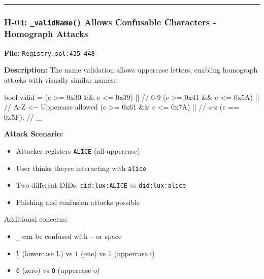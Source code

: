 \documentclass[
]{article}
\newenvironment{Shaded}{}{}
\newcommand{\NormalTok}[1]{#1}
\providecommand{\tightlist}{%
  \setlength{\itemsep}{0pt}\setlength{\parskip}{0pt}}
\begin{document}
\begin{center}\rule{0.5\linewidth}{0.5pt}\end{center}

\subsubsection{\texorpdfstring{H-04: \texttt{\_validName()} Allows
Confusable Characters - Homograph
Attacks}{H-04: \_validName() Allows Confusable Characters - Homograph Attacks}}\label{h-04-_validname-allows-confusable-characters---homograph-attacks}

\textbf{File:} \texttt{Registry.sol:435-448}

\textbf{Description:} The name validation allows uppercase letters,
enabling homograph attacks with visually similar names:

\begin{Shaded}
\begin{Highlighting}[]
\NormalTok{bool valid = (c \textgreater{}= 0x30 \&\& c \textless{}= 0x39) ||  // 0{-}9}
\NormalTok{            (c \textgreater{}= 0x41 \&\& c \textless{}= 0x5A) ||   // A{-}Z  \textless{}{-}{-} Uppercase allowed}
\NormalTok{            (c \textgreater{}= 0x61 \&\& c \textless{}= 0x7A) ||   // a{-}z}
\NormalTok{            (c == 0x5F);                   // \_}
\end{Highlighting}
\end{Shaded}

\textbf{Attack Scenario:}

\begin{itemize}
\tightlist
\item
  Attacker registers \texttt{ALICE} (all uppercase)
\item
  User thinks they\textquotesingle re interacting with \texttt{alice}
\item
  Two different DIDs: \texttt{did:lux:ALICE} vs \texttt{did:lux:alice}
\item
  Phishing and confusion attacks possible
\end{itemize}

Additional concerns:

\begin{itemize}
\tightlist
\item
  \texttt{\_} can be confused with \texttt{-} or space
\item
  \texttt{l} (lowercase L) vs \texttt{1} (one) vs \texttt{I} (uppercase
  i)
\item
  \texttt{0} (zero) vs \texttt{O} (uppercase o)
\end{itemize}
\end{document}
